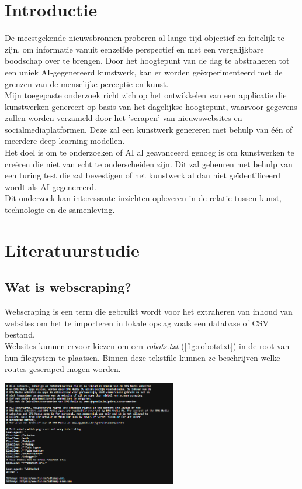 
\section{Introductie}%
\label{sec:introductie}
\noindent
De meestgekende nieuwsbronnen proberen al lange tijd objectief en feitelijk te zijn, om informatie vanuit eenzelfde perspectief en met een vergelijkbare boodschap over te brengen. Door het hoogtepunt van de dag te abstraheren tot een uniek AI-gegenereerd kunstwerk, kan er worden geëxperimenteerd met de grenzen van de menselijke perceptie en kunst. \\
\noindent
Mijn toegepaste onderzoek richt zich op het ontwikkelen van een applicatie die kunstwerken genereert op basis van het dagelijkse hoogtepunt, waarvoor gegevens zullen worden verzameld door het 'scrapen' van nieuwswebsites en socialmediaplatformen.
Deze zal een kunstwerk genereren met behulp van één of meerdere deep learning modellen. \\
\noindent
Het doel is om te onderzoeken of AI al geavanceerd genoeg is om kunstwerken te creëren die niet van echt te onderscheiden zijn. Dit zal gebeuren met behulp van een turing test die zal bevestigen of het kunstwerk al dan niet geïdentificeerd wordt als AI-gegenereerd. \\
\noindent
Dit onderzoek kan interessante inzichten opleveren in de relatie tussen kunst, technologie en de samenleving.


\section{Literatuurstudie}%
\subsection{Wat is webscraping?} 
\noindent
Webscraping is een term die gebruikt wordt voor het extraheren van inhoud van websites om het te importeren in lokale opslag zoals een database of CSV bestand.  \autocite{Salem2020} \\
\noindent
Websites kunnen ervoor kiezen om een \emph{robots.txt} (\ref{fig:robotstxt}) in de root van hun filesystem te plaatsen. Binnen deze tekstfile kunnen ze beschrijven welke routes gescraped mogen worden. \autocite{GoogleDocs} \\
\begin{center}
    \includegraphics[width = 3in]{robotstxt_hln}
    \label{fig:robotstxt}
\end{center}

